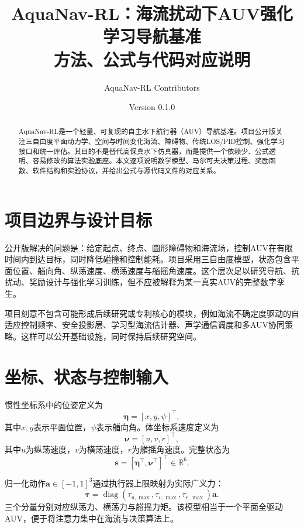\documentclass[11pt,a4paper]{ctexart}
\title{AquaNav-RL：海流扰动下AUV强化学习导航基准\\方法、公式与代码对应说明}
\author{AquaNav-RL Contributors}
\date{Version 0.1.0}
\begin{document}
\maketitle
\begin{abstract}
AquaNav-RL是一个轻量、可复现的自主水下航行器（AUV）导航基准。项目公开版关注三自由度平面动力学、空间与时间变化海流、障碍物、传统LOS/PID控制、强化学习接口和统一评估。其目的不是替代高保真水下仿真器，而是提供一个依赖少、公式透明、容易修改的算法实验底座。本文逐项说明数学模型、马尔可夫决策过程、奖励函数、软件结构和实验协议，并给出公式与源代码文件的对应关系。
\end{abstract}

\tableofcontents

\section{项目边界与设计目标}

公开版解决的问题是：给定起点、终点、圆形障碍物和海流场，控制AUV在有限时间内到达目标，同时降低碰撞和控制能耗。项目采用三自由度模型，状态包含平面位置、艏向角、纵荡速度、横荡速度与艏摇角速度。这个层次足以研究导航、抗扰动、奖励设计与强化学习训练，但不应被解释为某一真实AUV的完整数字孪生。

项目刻意不包含可能形成后续研究或专利核心的模块，例如海流不确定度驱动的自适应控制频率、安全投影层、学习型海流估计器、声学通信调度和多AUV协同策略。这样可以公开基础设施，同时保持后续研究空间。

\section{坐标、状态与控制输入}

惯性坐标系中的位姿定义为
\begin{equation}
\bm\eta=[x,y,\psi]^\top,
\end{equation}
其中$x,y$表示平面位置，$\psi$表示艏向角。体坐标系速度定义为
\begin{equation}
\bm\nu=[u,v,r]^\top,
\end{equation}
其中$u$为纵荡速度，$v$为横荡速度，$r$为艏摇角速度。完整状态为
\begin{equation}
\bm s=[\bm\eta^\top,\bm\nu^\top]^\top\in\mathbb R^6.
\end{equation}

归一化动作$\bm a\in[-1,1]^3$通过执行器上限映射为实际广义力：
\begin{equation}
\bm\tau=\operatorname{diag}(\tau_{u,\max},\tau_{v,\max},\tau_{r,\max})\bm a.
\end{equation}
三个分量分别对应纵荡力、横荡力与艏摇力矩。该模型相当于一个平面全驱动AUV，便于将注意力集中在海流与决策算法上。
\end{document}
